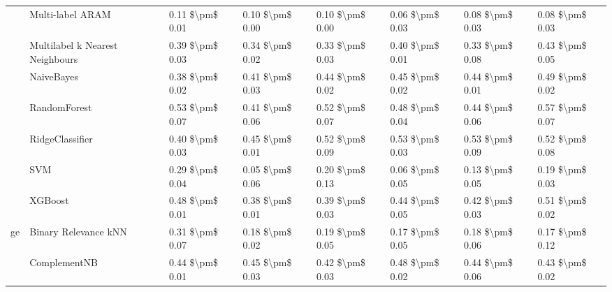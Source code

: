\begin{tabular}{llllllll}
   & Multi-label ARAM &  0.11 \$\textbackslash pm\$ 0.01 &           0.10 \$\textbackslash pm\$ 0.00 &       0.10 \$\textbackslash pm\$ 0.00 &        0.06 \$\textbackslash pm\$ 0.03 &                         0.08 \$\textbackslash pm\$ 0.03 &      0.08 \$\textbackslash pm\$ 0.03 \\
   & Multilabel k Nearest Neighbours &  0.39 \$\textbackslash pm\$ 0.03 &           0.34 \$\textbackslash pm\$ 0.02 &       0.33 \$\textbackslash pm\$ 0.03 &        0.40 \$\textbackslash pm\$ 0.01 &                         0.33 \$\textbackslash pm\$ 0.08 &      0.43 \$\textbackslash pm\$ 0.05 \\
   & NaiveBayes &  0.38 \$\textbackslash pm\$ 0.02 &           0.41 \$\textbackslash pm\$ 0.03 &       0.44 \$\textbackslash pm\$ 0.02 &        0.45 \$\textbackslash pm\$ 0.02 &                         0.44 \$\textbackslash pm\$ 0.01 &      0.49 \$\textbackslash pm\$ 0.02 \\
   & RandomForest &  0.53 \$\textbackslash pm\$ 0.07 &           0.41 \$\textbackslash pm\$ 0.06 &       0.52 \$\textbackslash pm\$ 0.07 &        0.48 \$\textbackslash pm\$ 0.04 &                         0.44 \$\textbackslash pm\$ 0.06 &      0.57 \$\textbackslash pm\$ 0.07 \\
   & RidgeClassifier &  0.40 \$\textbackslash pm\$ 0.03 &           0.45 \$\textbackslash pm\$ 0.01 &       0.52 \$\textbackslash pm\$ 0.09 &        0.53 \$\textbackslash pm\$ 0.03 &                         0.53 \$\textbackslash pm\$ 0.09 &      0.52 \$\textbackslash pm\$ 0.08 \\
   & SVM &  0.29 \$\textbackslash pm\$ 0.04 &           0.05 \$\textbackslash pm\$ 0.06 &       0.20 \$\textbackslash pm\$ 0.13 &        0.06 \$\textbackslash pm\$ 0.05 &                         0.13 \$\textbackslash pm\$ 0.05 &      0.19 \$\textbackslash pm\$ 0.03 \\
   & XGBoost &  0.48 \$\textbackslash pm\$ 0.01 &           0.38 \$\textbackslash pm\$ 0.01 &       0.39 \$\textbackslash pm\$ 0.03 &        0.44 \$\textbackslash pm\$ 0.05 &                         0.42 \$\textbackslash pm\$ 0.03 &      0.51 \$\textbackslash pm\$ 0.02 \\
ge & Binary Relevance kNN &  0.31 \$\textbackslash pm\$ 0.07 &           0.18 \$\textbackslash pm\$ 0.02 &       0.19 \$\textbackslash pm\$ 0.05 &        0.17 \$\textbackslash pm\$ 0.05 &                         0.18 \$\textbackslash pm\$ 0.06 &      0.17 \$\textbackslash pm\$ 0.12 \\
   & ComplementNB &  0.44 \$\textbackslash pm\$ 0.01 &           0.45 \$\textbackslash pm\$ 0.03 &       0.42 \$\textbackslash pm\$ 0.03 &        0.48 \$\textbackslash pm\$ 0.02 &                         0.44 \$\textbackslash pm\$ 0.06 &      0.43 \$\textbackslash pm\$ 0.02 \\

\end{tabular}
